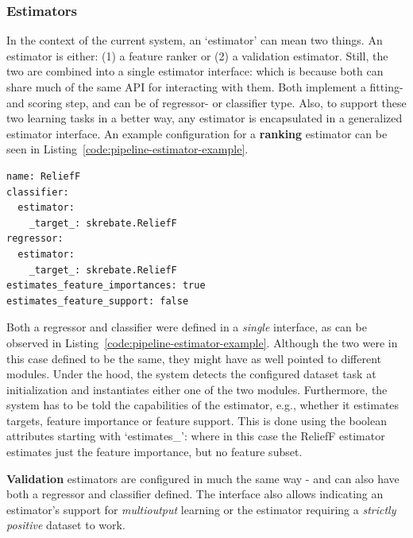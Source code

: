 \documentclass[../main.tex]{subfiles}
\begin{document}
\subsubsection{Estimators}
In the context of the current system, an `estimator' can mean two things. An estimator is either: (1) a feature ranker or (2) a validation estimator. Still, the two are combined into a single estimator interface: which is because both can share much of the same API for interacting with them. Both implement a fitting- and scoring step, and can be of regressor- or classifier type. Also, to support these two learning tasks in a better way, any estimator is encapsulated in a generalized estimator interface. An example configuration for a \textbf{ranking} estimator can be seen in Listing~\ref{code:pipeline-estimator-example}.

\begin{lstlisting}[caption={An estimator config for ReliefF \citep{kononenko_estimating_1994}.}, label={code:pipeline-estimator-example}]
name: ReliefF
classifier:
  estimator:
    _target_: skrebate.ReliefF
regressor:
  estimator:
    _target_: skrebate.ReliefF
estimates_feature_importances: true
estimates_feature_support: false
\end{lstlisting}

Both a regressor and classifier were defined in a \textit{single} interface, as can be observed in Listing~\ref{code:pipeline-estimator-example}. Although the two were in this case defined to be the same, they might have as well pointed to different modules. Under the hood, the system detects the configured dataset task at initialization and instantiates either one of the two modules. Furthermore, the system has to be told the capabilities of the estimator, e.g., whether it estimates targets, feature importance or feature support. This is done using the boolean attributes starting with `estimates\_': where in this case the ReliefF estimator estimates just the feature importance, but no feature subset.

\textbf{Validation} estimators are configured in much the same way - and can also have both a regressor and classifier defined. The interface also allows indicating an estimator's support for \textit{multioutput} learning or the estimator requiring a \textit{strictly positive} dataset to work.
\end{document}
